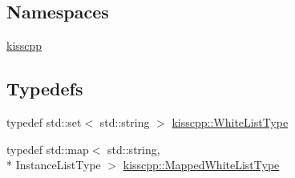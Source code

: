 \subsection*{Namespaces}
\begin{DoxyCompactItemize}
\item 
\hyperlink{a00089}{kisscpp}
\end{DoxyCompactItemize}
\subsection*{Typedefs}
\begin{DoxyCompactItemize}
\item 
typedef std\-::set$<$ std\-::string $>$ \hyperlink{a00089_a6aa00ccbe46e3a892fa90d3fbf6e3439}{kisscpp\-::\-White\-List\-Type}
\item 
typedef std\-::map$<$ std\-::string, \\*
Instance\-List\-Type $>$ \hyperlink{a00089_a33979b59a2b404e85c9416071d843412}{kisscpp\-::\-Mapped\-White\-List\-Type}
\end{DoxyCompactItemize}
